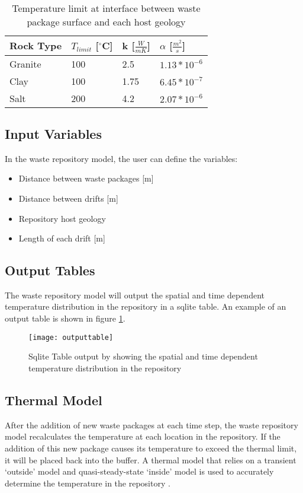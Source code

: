 \begin{table}[h]
    \centering
	\label{tab:temp_limit}
    \caption{Temperature limit at interface between waste package 
    surface and each host geology \cite{sutton_investigations_2011}}
	\begin{tabular}{|l|l|l|l|}
	\hline
	Rock Type & $T_{limit}$ [$^\circ$C] & k [$\frac{W}{mK}$] &  $\alpha$ [$\frac{m^2}{s}$]  \\ \hline
	Granite   & 100 & 2.5  & $1.13*10^{-6}$\\ \hline
	Clay      & 100 & 1.75 & $6.45*10^{-7}$\\ \hline
	Salt      & 200 & 4.2  & $2.07*10^{-6}$\\ \hline
	\end{tabular}
\end{table}

\subsection{Input Variables}

In the waste repository model, the user can define the variables: 
	\begin{itemize}
		\item Distance between waste packages [m]
		\item Distance between drifts [m]
		\item Repository host geology 
		\item Length of each drift [m]
	\end{itemize}
	
\subsection{Output Tables}
The waste repository model will output the spatial and time 
dependent temperature distribution in the repository in a sqlite 
table. An example of an output table is shown in figure 
\ref{fig:outputtable}. 

\begin{figure}[h]
	\texttt{[image: outputtable]}
	\caption{Sqlite Table output by \Cyclus showing the spatial and 
	time dependent temperature distribution in the repository}
    \label{fig:outputtable}
\end{figure}

\subsection{Thermal Model}
After the addition of new waste packages at each time step, the 
waste repository model recalculates the temperature at each location
in the repository. 
If the addition of this new package causes its temperature to exceed
the thermal limit, it will be placed back into the buffer. 
A thermal model that relies on a transient `outside' model and 
quasi-steady-state `inside' model is used to accurately determine 
the temperature in the repository \cite{sutton_investigations_2011}.

